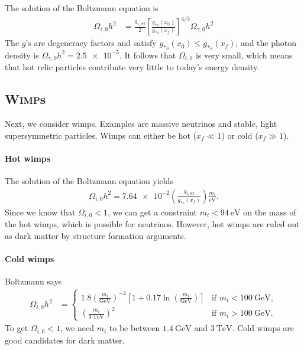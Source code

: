 The solution of the Boltzmann equation is
	\begin{align*}
		\Omega_{i,0} h^2
		&= \frac{ g_{i,\text{eff}} }{2}  \left[ \frac{g_{*s}(x_0)}{g_{*s}(x_f)} \right]^{4/3} \Omega_{\gamma, 0} h^2
	\end{align*}
The $g$'s are degeneracy factors and satisfy $g_{*s}(x_0) \leq g_{*s}(x_f)$, and the photon density is $\Omega_{\gamma,0} h^2 = \num{2.5e-5}$. It follows that $\Omega_{i,0}$ is very small, which means that hot relic particles contribute very little to today's energy density.

\subsection{\textsc{Wimp}s}


Next, we consider \acp{wimp}. Examples are massive neutrinos and stable, light supersymmetric particles. \acp{Wimp} can either be hot ($x_f \ll 1$) or cold ($x_f \gg 1$).

\paragraph*{Hot \acp{wimp}}
The solution of the Boltzmann equation yields
\begin{align*}
	\Omega_{i,0} h^2 = \num{7.64e-2} 
	\left( \frac{g_{i,\text{eff}}}{g_{*s}(x_f)} \right)
	\frac{m_i}{\si{\eV}}.
\end{align*}
Since we know that $\Omega_{i,0} < 1$, we can get a constraint $m_i < \SI{94}{\eV}$ on the mass of the hot \acp{wimp}, which is possible for neutrinos. However, hot \acp{wimp} are ruled out as dark matter by structure formation arguments.

\paragraph*{Cold \acp{wimp}}
Boltzmann says
\begin{align*}
	\Omega_{i,0} h^2
	&= \begin{cases}
	1.8 \left( \frac{m_i}{\si{\GeV}} \right)^{-2} 
	\left[ 1 + 0.17 \ln\left( \frac{m_i}{\si{\GeV}} \right) \right]
	& \text{if } m_i < \SI{100}{\GeV},\\
	\left( \frac{m_i}{\SI{3}{\TeV}} \right)^2
	& \text{if } m_i > \SI{100}{\GeV}.
	\end{cases}
\end{align*}
To get $\Omega_{i,0} < 1$, we need $m_i$ to be between $\SI{1.4}{\GeV}$ and $\SI{3}{\TeV}$. Cold \acp{wimp} are good candidates for dark matter.

